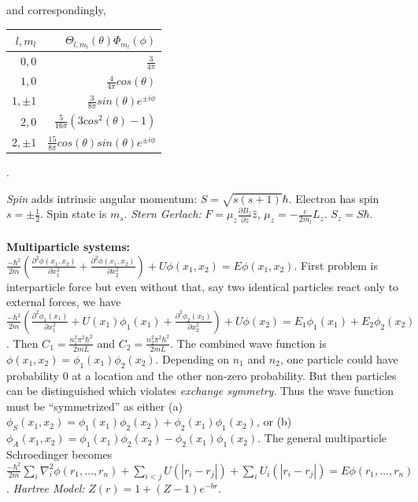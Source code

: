 and correspondingly,
\begin{center}
\begin{tabular} {|r r|}
\hline
$l, m_l$ & $\Theta_{l, m_l}(\theta) \Phi_{m_l}(\phi)$ \\
\hline
$0,0$ & ${\frac {3} {4 \pi}}$ \\
\hline
$1,0$ & ${\frac {4} {4 \pi}} cos(\theta)$ \\
\hline
$1,\pm 1$ & ${\frac {3} {8 \pi}} sin(\theta) e^{\pm i \phi}$ \\
\hline
$2,0$ & ${\frac {5} {16 \pi}} (3 cos^2(\theta) -1)$ \\
\hline
$2,\pm 1$ & ${\frac {15} {8 \pi}} cos(\theta) sin(\theta) e^{\pm i \phi}$ \\
\hline
\end{tabular}.
\end{center}
\emph{Spin} adds intrinsic angular momentum: $S= \sqrt{s(s+1)} \hbar$.  Electron has spin
$s= \pm {\frac 1 2}$.  Spin state is $m_s$.  \emph{Stern Gerlach:}
$F= \mu_z {\frac {\partial B_z} {\partial z}} \hat{z}$, $\mu_z= -{\frac e {2m_l}} L_z$.
$S_z = S \hbar$. 
\\
\\
{\bf Multiparticle systems:}
${\frac {- \hbar^2} {2m}} ( {\frac {\partial^2 \phi(x_1, x_2)} {\partial x_1^2}}
+ {\frac {\partial^2 \phi(x_1, x_2)} {\partial x_2^2}}) + U\phi(x_1, x_2)= E \phi(x_1, x_2)$.
First problem is interparticle force but even without that, 
say two identical particles react only to external forces, we have
${\frac {- \hbar^2} {2m}} ( {\frac {\partial^2 \phi_1(x_1)} {\partial x_1^2}} + 
U(x_1) \phi_1(x_1)+ {\frac {\partial^2 \phi_2(x_2)} {\partial x_2^2}}) + 
U\phi(x_2)= E_1\phi_1(x_1)+ E_2 \phi_2(x_2)$.
Then $C_1= {\frac {n_1^2 \pi^2 \hbar^2} {2mL}}$ and
$C_2= {\frac {n_2^2 \pi^2 \hbar^2} {2mL}}$.  The combined wave function is
$\phi(x_1, x_2)= \phi_1(x_1) \phi_2(x_2)$.  Depending on $n_1$ and $n_2$, one particle
could have probability $0$ at a location and the other non-zero probability.  But then
particles can be distinguished which violates 
\emph{exchange symmetry}.  Thus the wave function must be
``symmetrized'' as either
(a)  $\phi_S(x_1 , x_2) = \phi_{1}(x_1) \phi_2(x_2) + \phi_2(x_1) \phi_1(x_2)$, or
(b)  $\phi_A(x_1 , x_2) = \phi_{1}(x_1) \phi_2(x_2) - \phi_2(x_1) \phi_1(x_2)$.
The general multiparticle Schroedinger becomes
${\frac {- \hbar^2} {2m}} \sum_i \nabla_i^2 \phi(r_1, \ldots, r_n) +
\sum_{i<j} U(|r_i - r_j|) +
\sum_{i} U_i(|r_i - r_j|) = E \phi(r_1 , \ldots , r_n)$.  \emph{Hartree Model:}
$Z(r)= 1 + (Z-1) e^{-br}$.
\\
